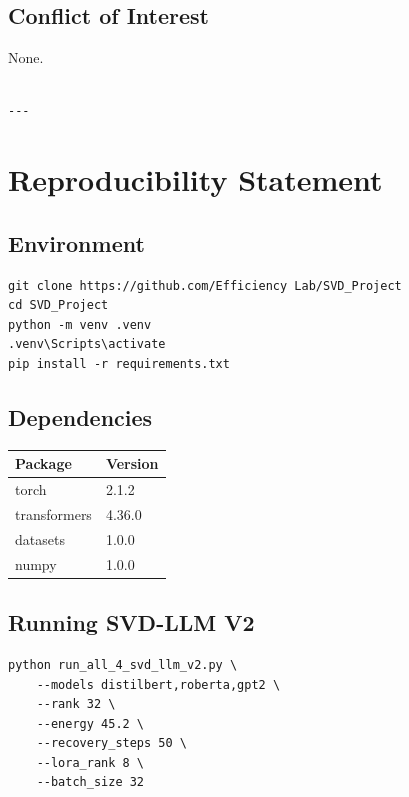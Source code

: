 \subsection{Conflict of Interest}

None.
\begin{lstlisting}

---
\end{lstlisting}


\section{Reproducibility Statement}

\subsection{Environment}

\begin{lstlisting}
git clone https://github.com/Efficiency Lab/SVD_Project
cd SVD_Project
python -m venv .venv
.venv\Scripts\activate
pip install -r requirements.txt
\end{lstlisting}

\subsection{Dependencies}

\begin{table}[H]
\centering
\small
\begin{tabular}{ll}
\toprule
\textbf{Package} & \textbf{Version} \\
\midrule
torch & 2.1.2 \\
transformers & 4.36.0 \\
datasets & 1.0.0 \\
numpy & 1.0.0 \\
\bottomrule
\end{tabular}
\end{table}

\subsection{Running SVD-LLM V2}

\begin{lstlisting}
python run_all_4_svd_llm_v2.py \
    --models distilbert,roberta,gpt2 \
    --rank 32 \
    --energy 45.2 \
    --recovery_steps 50 \
    --lora_rank 8 \
    --batch_size 32
\end{lstlisting}

